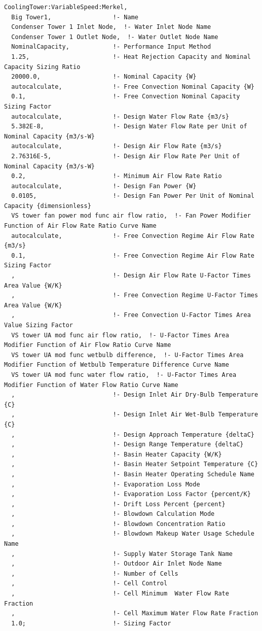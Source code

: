 \begin{lstlisting}
CoolingTower:VariableSpeed:Merkel,
  Big Tower1,                 !- Name
  Condenser Tower 1 Inlet Node,  !- Water Inlet Node Name
  Condenser Tower 1 Outlet Node,  !- Water Outlet Node Name
  NominalCapacity,            !- Performance Input Method
  1.25,                       !- Heat Rejection Capacity and Nominal Capacity Sizing Ratio
  20000.0,                    !- Nominal Capacity {W}
  autocalculate,              !- Free Convection Nominal Capacity {W}
  0.1,                        !- Free Convection Nominal Capacity Sizing Factor
  autocalculate,              !- Design Water Flow Rate {m3/s}
  5.382E-8,                   !- Design Water Flow Rate per Unit of Nominal Capacity {m3/s-W}
  autocalculate,              !- Design Air Flow Rate {m3/s}
  2.76316E-5,                 !- Design Air Flow Rate Per Unit of Nominal Capacity {m3/s-W}
  0.2,                        !- Minimum Air Flow Rate Ratio
  autocalculate,              !- Design Fan Power {W}
  0.0105,                     !- Design Fan Power Per Unit of Nominal Capacity {dimensionless}
  VS tower fan power mod func air flow ratio,  !- Fan Power Modifier Function of Air Flow Rate Ratio Curve Name
  autocalculate,              !- Free Convection Regime Air Flow Rate {m3/s}
  0.1,                        !- Free Convection Regime Air Flow Rate Sizing Factor
  ,                           !- Design Air Flow Rate U-Factor Times Area Value {W/K}
  ,                           !- Free Convection Regime U-Factor Times Area Value {W/K}
  ,                           !- Free Convection U-Factor Times Area Value Sizing Factor
  VS tower UA mod func air flow ratio,  !- U-Factor Times Area Modifier Function of Air Flow Ratio Curve Name
  VS tower UA mod func wetbulb difference,  !- U-Factor Times Area Modifier Function of Wetbulb Temperature Difference Curve Name
  VS tower UA mod func water flow ratio,  !- U-Factor Times Area Modifier Function of Water Flow Ratio Curve Name
  ,                           !- Design Inlet Air Dry-Bulb Temperature {C}
  ,                           !- Design Inlet Air Wet-Bulb Temperature {C}
  ,                           !- Design Approach Temperature {deltaC}
  ,                           !- Design Range Temperature {deltaC}
  ,                           !- Basin Heater Capacity {W/K}
  ,                           !- Basin Heater Setpoint Temperature {C}
  ,                           !- Basin Heater Operating Schedule Name
  ,                           !- Evaporation Loss Mode
  ,                           !- Evaporation Loss Factor {percent/K}
  ,                           !- Drift Loss Percent {percent}
  ,                           !- Blowdown Calculation Mode
  ,                           !- Blowdown Concentration Ratio
  ,                           !- Blowdown Makeup Water Usage Schedule Name
  ,                           !- Supply Water Storage Tank Name
  ,                           !- Outdoor Air Inlet Node Name
  ,                           !- Number of Cells
  ,                           !- Cell Control
  ,                           !- Cell Minimum  Water Flow Rate Fraction
  ,                           !- Cell Maximum Water Flow Rate Fraction
  1.0;                        !- Sizing Factor


\end{lstlisting}
